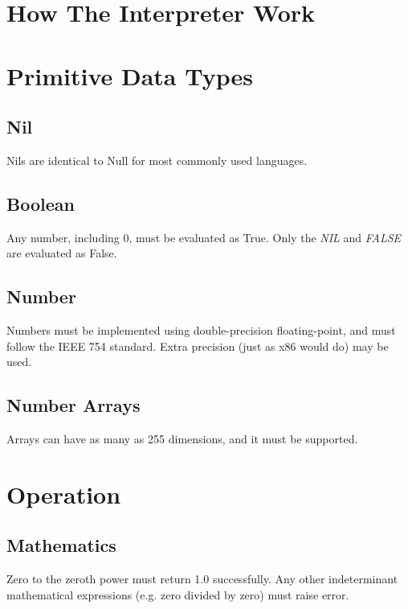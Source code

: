 \section{How The Interpreter Work}



\section{Primitive Data Types}

\subsection{Nil}
Nils are identical to Null for most commonly used languages.

\subsection{Boolean}
Any number, including 0, must be evaluated as True. Only the \emph{NIL} and \emph{FALSE} are evaluated as False.

\subsection{Number}
Numbers must be implemented using double-precision floating-point, and must follow the IEEE 754 standard. Extra precision (just as x86 would do) may be used.

\subsection{Number Arrays}
Arrays can have as many as 255 dimensions, and it must be supported.



\section{Operation}

\subsection{Mathematics}
Zero to the zeroth power must return 1.0 successfully. Any other indeterminant mathematical expressions (e.g. zero divided by zero) must raise  error.
